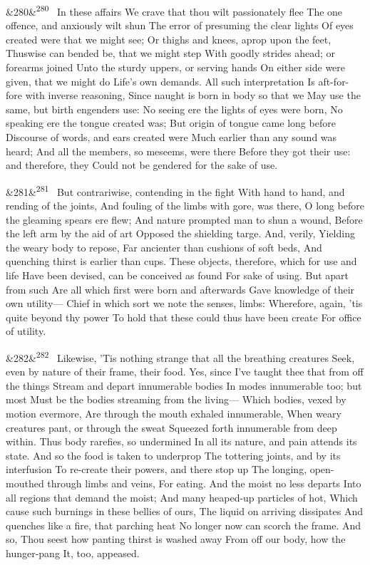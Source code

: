\documentclass[12pt]{article}
\newcommand{\para}[1][]{\par\noindent\ifx&#1&\else\textsuperscript{\footnotesize #1}~\fi}
\begin{document}
\para[280] In these affairs We crave that thou wilt passionately flee The one offence, and anxiously wilt shun The error of presuming the clear lights Of eyes created were that we might see; Or thighs and knees, aprop upon the feet, Thuswise can bended be, that we might step With goodly strides ahead; or forearms joined Unto the sturdy uppers, or serving hands On either side were given, that we might do Life's own demands. All such interpretation Is aft-for-fore with inverse reasoning, Since naught is born in body so that we May use the same, but birth engenders use: No seeing ere the lights of eyes were born, No speaking ere the tongue created was; But origin of tongue came long before Discourse of words, and ears created were Much earlier than any sound was heard; And all the members, so meseems, were there Before they got their use: and therefore, they Could not be gendered for the sake of use.

\para[281] But contrariwise, contending in the fight With hand to hand, and rending of the joints, And fouling of the limbs with gore, was there, O long before the gleaming spears ere flew; And nature prompted man to shun a wound, Before the left arm by the aid of art Opposed the shielding targe. And, verily, Yielding the weary body to repose, Far ancienter than cushions of soft beds, And quenching thirst is earlier than cups. These objects, therefore, which for use and life Have been devised, can be conceived as found For sake of using. But apart from such Are all which first were born and afterwards Gave knowledge of their own utility--- Chief in which sort we note the senses, limbs: Wherefore, again, 'tis quite beyond thy power To hold that these could thus have been create For office of utility.

\para[282] Likewise, 'Tis nothing strange that all the breathing creatures Seek, even by nature of their frame, their food. Yes, since I've taught thee that from off the things Stream and depart innumerable bodies In modes innumerable too; but most Must be the bodies streaming from the living--- Which bodies, vexed by motion evermore, Are through the mouth exhaled innumerable, When weary creatures pant, or through the sweat Squeezed forth innumerable from deep within. Thus body rarefies, so undermined In all its nature, and pain attends its state. And so the food is taken to underprop The tottering joints, and by its interfusion To re-create their powers, and there stop up The longing, open-mouthed through limbs and veins, For eating. And the moist no less departs Into all regions that demand the moist; And many heaped-up particles of hot, Which cause such burnings in these bellies of ours, The liquid on arriving dissipates And quenches like a fire, that parching heat No longer now can scorch the frame. And so, Thou seest how panting thirst is washed away From off our body, how the hunger-pang It, too, appeased.
\end{document}
